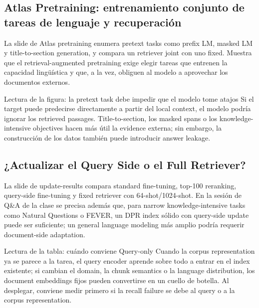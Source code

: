 \subsection{Atlas Pretraining: entrenamiento conjunto de tareas de lenguaje y recuperación}

La slide de Atlas pretraining enumera pretext tasks como prefix LM, masked LM y title-to-section generation, y compara un retriever joint con uno fixed. Muestra que el retrieval-augmented pretraining exige elegir tareas que entrenen la capacidad lingüística y que, a la vez, obliguen al modelo a aprovechar los documentos externos.


\begin{knowledgebox}{Lectura de la figura: la pretext task debe impedir que el modelo tome atajos}
Si el target puede predecirse directamente a partir del local context, el modelo podría ignorar los retrieved passages. Title-to-section, los masked spans o los knowledge-intensive objectives hacen más útil la evidence externa; sin embargo, la construcción de los datos también puede introducir answer leakage.
\end{knowledgebox}

\subsection{¿Actualizar el Query Side o el Full Retriever?}

La slide de update-results compara standard fine-tuning, top-100 reranking, query-side fine-tuning y fixed retriever con 64-shot/1024-shot. En la sesión de Q\&A de la clase se precisa además que, para narrow knowledge-intensive tasks como Natural Questions o FEVER, un DPR index sólido con query-side update puede ser suficiente; un general language modeling más amplio podría requerir document-side adaptation.


\begin{knowledgebox}{Lectura de la tabla: cuándo conviene Query-only}
Cuando la corpus representation ya se parece a la tarea, el query encoder aprende sobre todo a entrar en el index existente; si cambian el domain, la chunk semantics o la language distribution, los document embeddings fijos pueden convertirse en un cuello de botella. Al desplegar, conviene medir primero si la recall failure se debe al query o a la corpus representation.
\end{knowledgebox}

